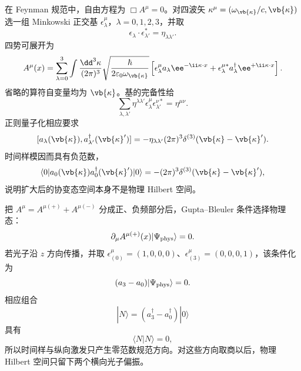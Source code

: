 在 Feynman 规范中，自由方程为 $\Box A^\mu=0$。对四波矢 $\kappa^\mu=(\omega_{\vb{\kappa}}/c,\vb{\kappa})$ 选一组 Minkowski 正交基 $\epsilon_\lambda^\mu$，$\lambda=0,1,2,3$，并取
\begin{equation}
 \epsilon_\lambda\cdot\epsilon_{\lambda'}^*=\eta_{\lambda\lambda'}.
 \label{eq:fourpol-orthonormal-r13}
\end{equation}
四势可展开为
\begin{equation}
 A^\mu(x)=
 \sum_{\lambda=0}^{3}
 \int\frac{\dd^3 \kappa}{(2\pi)^3}
 \sqrt{\frac{\hbar}{2\varepsilon_0\omega_{\vb{\kappa}}}}
 \left[
 \epsilon_\lambda^\mu a_\lambda \ee^{-\ii\kappa\cdot x}
 +\epsilon_\lambda^{\mu *}a_\lambda^\dagger \ee^{+\ii\kappa\cdot x}
 \right].
 \label{eq:covariant-photon-fourpol-r7}
\end{equation}
省略的算符自变量均为 $\vb{\kappa}$。基的完备性给
\begin{equation}
 {
 \sum_{\lambda,\lambda'}
 \eta^{\lambda\lambda'}
 \epsilon_\lambda^\mu\epsilon_{\lambda'}^{\nu *}
 =\eta^{\mu\nu}.}
 \label{eq:fourpol-completeness-r7}
\end{equation}
正则量子化相应要求
\begin{equation}
 {
 [a_\lambda(\vb{\kappa}),a_{\lambda'}^\dagger(\vb{\kappa}')]
 =-\eta_{\lambda\lambda'}(2\pi)^3
 \delta^{(3)}(\vb{\kappa}-\vb{\kappa}').}
 \label{eq:covariant-photon-mode-comm-r7}
\end{equation}
时间样模因而具有负范数，
\begin{equation}
 \langle0|a_0(\vb{\kappa})a_0^\dagger(\vb{\kappa}')|0\rangle
 =-(2\pi)^3\delta^{(3)}(\vb{\kappa}-\vb{\kappa}'),
 \label{eq:timelike-negative-norm-r7}
\end{equation}
说明扩大后的协变态空间本身不是物理 Hilbert 空间。

把 $A^\mu=A^{\mu(+)}+A^{\mu(-)}$ 分成正、负频部分后，Gupta--Bleuler 条件选择物理态：
\begin{equation}
 {
 \partial_\mu A^{\mu(+)}(x)|\Psi_{\rm phys}\rangle=0.}
 \label{eq:gupta-bleuler-r2}
\end{equation}
若光子沿 $z$ 方向传播，并取 $\epsilon_{(0)}^\mu=(1,0,0,0)$、$\epsilon_{(3)}^\mu=(0,0,0,1)$，该条件化为
\begin{equation}
 {(a_3-a_0)|\Psi_{\rm phys}\rangle=0.}
 \label{eq:GB-mode-condition-r7}
\end{equation}
相应组合
\begin{equation*}
 |N\rangle=(a_3^\dagger-a_0^\dagger)|0\rangle
\end{equation*}
具有
\begin{equation}
 {\langle N|N\rangle=0,}
 \label{eq:GB-null-state-r7}
\end{equation}
所以时间样与纵向激发只产生零范数规范方向。对这些方向取商以后，物理 Hilbert 空间只留下两个横向光子偏振。

